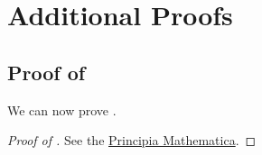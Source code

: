 \section{Additional Proofs}
\subsection{Proof of }\label{app:1}
We can now prove .
\begin{proof}[Proof of ]
	See the \href{https://quod.lib.umich.edu/cgi/t/text/pageviewer-idx?c=umhistmath&cc=umhistmath&idno=aat3201.0001.001&frm=frameset&view=image&seq=401}{Principia Mathematica}. \nocite{web:note-template}
\end{proof}